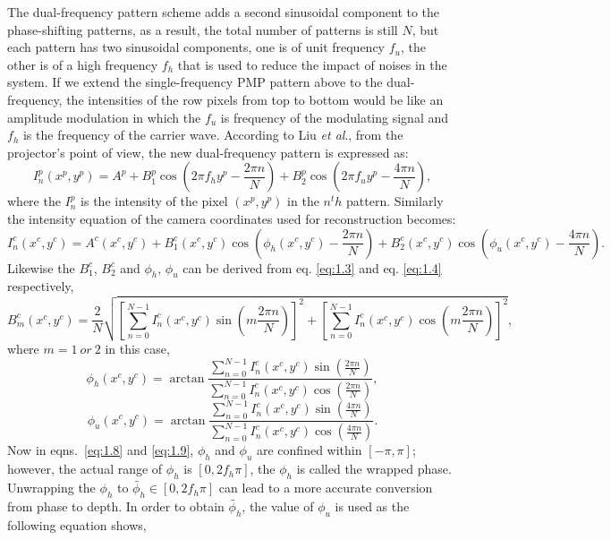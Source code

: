 \documentclass[]{spie}  %
\begin{document}
The dual-frequency pattern scheme adds a second sinusoidal component to the phase-shifting patterns, as a result, the total number of patterns is still $N$, but each pattern has two sinusoidal components, one is of unit frequency $f_u$, the other is of a high frequency $f_h$ that is used to reduce the impact of noises in the system. If we extend the single-frequency PMP pattern above to the dual-frequency, the intensities of the row pixels from top to bottom would be like an amplitude modulation in which the $f_u$ is frequency of the modulating signal and $f_h$ is the frequency of the carrier wave. According to Liu \textit{et al}., from the projector's point of view, the new dual-frequency pattern is expressed as:
  \begin{equation} \label{eq:1.5}
  	I^p_n(x^p, y^p) = A^p + B^p_1\cos(2\pi f_h y^p - \frac{2\pi n}{N}) + B^p_2\cos(2\pi f_u y^p - \frac{4\pi n}{N}),
  \end{equation}
where the $I^p_n$ is the intensity of the pixel $(x^p, y^p)$ in the $n^th$ pattern. Similarly the intensity equation of the camera coordinates used for reconstruction becomes:
 \begin{equation} \label{eq:1.6}
  	I^c_n(x^c, y^c) =  A^c(x^c, y^c) + B^c_1(x^c, y^c)\cos(\phi_h(x^c, y^c) - \frac{2\pi n}{N}) + B^c_2(x^c, y^c)\cos(\phi_u(x^c, y^c) - \frac{4\pi n}{N}).
  \end{equation}
Likewise the $B^c_1$, $B^c_2$ and $\phi_h$, $\phi_u$ can be derived from eq. \eqref{eq:1.3} and eq. \eqref{eq:1.4} respectively,
  \begin{equation} \label{eq:1.7}
  	B^c_m(x^c, y^c) = \frac{2}{N}\sqrt{\left[\sum_{n=0}^{N-1}I_n^c(x^c, y^c)\sin (m\frac{2\pi n}{N})\right]^2 + \left[\sum_{n=0}^{N-1}I_n^c(x^c, y^c)\cos (m\frac{2\pi n}{N})\right]^2},
  \end{equation}
where $m = 1\: or\: 2$ in this case,
 \begin{equation} \label{eq:1.8}
  	\phi_h (x^c, y^c) = \arctan \frac{\sum_{n=0}^{N-1} I^c_n(x^c, y^c)\sin(\frac{2\pi n}{N})}{\sum_{n=0}^{N-1} I^c_n(x^c, y^c)\cos(\frac{2\pi n}{N})},
  \end{equation}
 \begin{equation} \label{eq:1.9}
  	\phi_u (x^c, y^c) = \arctan \frac{\sum_{n=0}^{N-1} I^c_n(x^c, y^c)\sin(\frac{4\pi n}{N})}{\sum_{n=0}^{N-1} I^c_n(x^c, y^c)\cos(\frac{4\pi n}{N})}.
  \end{equation}
Now in eqns.~\eqref{eq:1.8} and \eqref{eq:1.9}, $\phi_h$ and $\phi_u$ are confined within $[-\pi, \pi]$; however, the actual range of $\phi_h$ is $[0, 2f_h\pi]$, the  $\phi_h$ is called the wrapped phase. Unwrapping the $\phi_h$ to $\tilde{\phi_h} \in [0, 2f_h\pi]$ can lead to a more accurate conversion from phase to depth.  In order to obtain $\tilde{\phi_h}$, the value of $\phi_u$ is used as the following equation shows,
\end{document}
